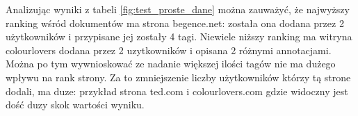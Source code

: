 Analizując wyniki z tabeli \ref{fig:test_proste_dane} można zauważyć, że najwyższy ranking wśród dokumentów ma strona begence.net: została ona dodana przez 2 użytkowników i przypisane jej zostały 4 tagi. Niewiele niższy ranking ma witryna colourlovers dodana przez 2 uzytkowników i opisana 2 różnymi annotacjami. Można po tym wywnioskować ze nadanie większej ilości tagów nie ma dużego wpływu na rank strony. Za to zmniejszenie liczby użytkowników którzy tą strone dodali, ma duze: przykład strona ted.com i colourlovers.com gdzie widoczny jest dość duzy skok wartości wyniku.



